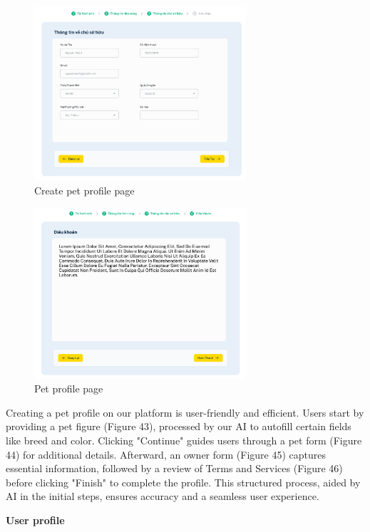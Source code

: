\begin {figure}[H]
\centering
\includegraphics[width=0.7\textwidth]{Figures/user_input_ui.png}
\caption{Create pet profile page}
\end{figure}

\begin {figure}[H]
\centering
\includegraphics[width=0.7\textwidth]{Figures/term_ui.png}
\caption{Pet profile page}
\end{figure}

Creating a pet profile on our platform is user-friendly and efficient. Users start by providing a pet figure (Figure 43), processed by our AI to autofill certain fields like breed and color. Clicking "Continue" guides users through a pet form (Figure 44) for additional details. Afterward, an owner form (Figure 45) captures essential information, followed by a review of Terms and Services (Figure 46) before clicking "Finish" to complete the profile. This structured process, aided by AI in the initial steps, ensures accuracy and a seamless user experience.

\textbf{User profile}

